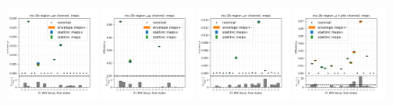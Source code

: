 \begin{figure}
    \includegraphics[width=0.24\textwidth]{appendices/ttSystReweighting/figures/afterCorr/icata1_ch0_meps.png}
    \includegraphics[width=0.24\textwidth]{appendices/ttSystReweighting/figures/afterCorr/icata1_ch1_meps.png}
    \includegraphics[width=0.24\textwidth]{appendices/ttSystReweighting/figures/afterCorr/icata1_ch2_meps.png}
    \includegraphics[width=0.24\textwidth]{appendices/ttSystReweighting/figures/afterCorr/icata1_ch3_meps.png}
    

\end{figure}
